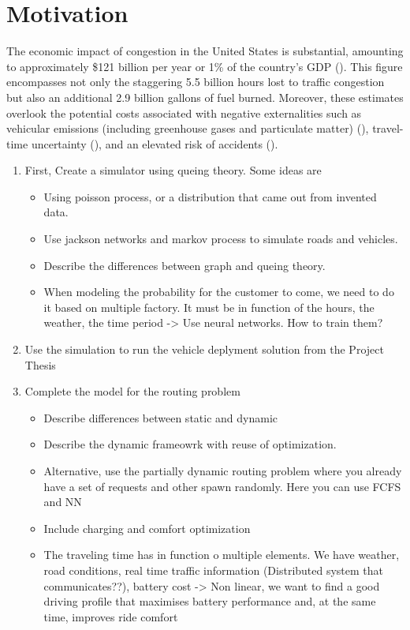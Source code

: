 \chapter{Motivation}
The economic impact of congestion in the United States is substantial, amounting to approximately \$121 billion per year or 1\% of the country's GDP (\cite{schrank2012}). This figure encompasses not only the staggering 5.5 billion hours lost to traffic congestion but also an additional 2.9 billion gallons of fuel burned. Moreover, these estimates overlook the potential costs associated with negative externalities such as vehicular emissions (including greenhouse gases and particulate matter) (\cite{pant2013}), travel-time uncertainty (\cite{carrion2012}), and an elevated risk of accidents (\cite{hennessy1999}).

\begin{enumerate}
	\item First, Create a simulator using queing theory. Some ideas are
		\begin{itemize}
				\item Using poisson process, or a distribution that came out from invented data. 
				\item Use jackson networks and markov process to simulate roads and vehicles. 
				\item Describe the differences between graph and queing theory. 
				\item When modeling the probability for the customer to come, we need to do it based on multiple factory. It must be in function of the hours, the weather, the time period -> Use neural networks. How to train them? 
		\end{itemize}
		\item Use the simulation to run the vehicle deplyment solution from the Project Thesis
		\item Complete the model for the routing problem
			\begin{itemize}
			\item Describe differences between static and dynamic
			\item Describe the dynamic frameowrk with reuse of optimization. 
			\item Alternative, use the partially dynamic routing problem where you already have a set of requests and other spawn randomly. Here you can use FCFS and NN
			\item Include charging and comfort optimization
			\item The traveling time has in function o multiple elements. We have weather, road conditions, real time traffic information (Distributed system that communicates??), battery cost -> Non linear, we want to find a good driving profile that maximises battery performance and, at the same time, improves ride comfort
					\end{itemize}
		

\end{enumerate}
